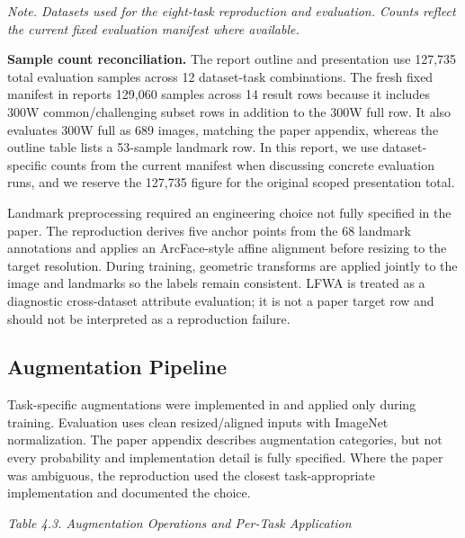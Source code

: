 \documentclass[11pt]{article}
\begin{document}
\emph{Note. Datasets used for the eight-task reproduction and evaluation. Counts reflect the current fixed evaluation manifest where available.}

\textbf{Sample count reconciliation.} The report outline and presentation use 127,735 total evaluation samples across 12 dataset-task combinations. The fresh fixed manifest in  reports 129,060 samples across 14 result rows because it includes 300W common/challenging subset rows in addition to the 300W full row. It also evaluates 300W full as 689 images, matching the paper appendix, whereas the outline table lists a 53-sample landmark row. In this report, we use dataset-specific counts from the current manifest when discussing concrete evaluation runs, and we reserve the 127,735 figure for the original scoped presentation total.


Landmark preprocessing required an engineering choice not fully specified in the paper. The reproduction derives five anchor points from the 68 landmark annotations and applies an ArcFace-style affine alignment before resizing to the target resolution. During training, geometric transforms are applied jointly to the image and landmarks so the labels remain consistent. LFWA is treated as a diagnostic cross-dataset attribute evaluation; it is not a paper target row and should not be interpreted as a reproduction failure.


\subsection{Augmentation Pipeline}


Task-specific augmentations were implemented in  and applied only during training. Evaluation uses clean resized/aligned inputs with ImageNet normalization. The paper appendix describes augmentation categories, but not every probability and implementation detail is fully specified. Where the paper was ambiguous, the reproduction used the closest task-appropriate implementation and documented the choice.


\emph{Table 4.3. Augmentation Operations and Per-Task Application}
\end{document}
